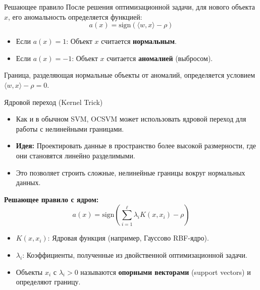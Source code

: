 \documentclass{beamer}
\begin{document}
\begin{frame}{Решающее правило}
    После решения оптимизационной задачи, для нового объекта $x$, его аномальность определяется функцией:
    \[ 
        a(x) = \text{sign}\left( \langle w, x \rangle - \rho \right)
    \]
    \begin{itemize}
        \item Если $a(x) = 1$: Объект $x$ считается \textbf{нормальным}.
        \item Если $a(x) = -1$: Объект $x$ считается \textbf{аномалией} (выбросом).
    \end{itemize}
    Граница, разделяющая нормальные объекты от аномалий, определяется условием $\langle w, x \rangle - \rho = 0$.
\end{frame}

\begin{frame}{Ядровой переход (Kernel Trick)}
    \begin{itemize}
        \item Как и в обычном SVM, OCSVM может использовать ядровой переход для работы с нелинейными границами.
        \item \textbf{Идея:} Проектировать данные в пространство более высокой размерности, где они становятся линейно разделимыми.
        \item Это позволяет строить сложные, нелинейные границы вокруг нормальных данных.
    \end{itemize}
    \textbf{Решающее правило с ядром:}
    \[
        a(x) = \text{sign}\left( \sum_{i = 1}^{\ell} \lambda_i K(x, x_i) - \rho \right)
    \]
    \begin{itemize}
        \item $K(x, x_i)$: Ядровая функция (например, Гауссово RBF-ядро).
        \item $\lambda_i$: Коэффициенты, полученные из двойственной оптимизационной задачи.
        \item Объекты $x_i$ с $\lambda_i > 0$ называются \textbf{опорными векторами} (support vectors) и определяют границу.
    \end{itemize}
\end{frame}
\end{document}
